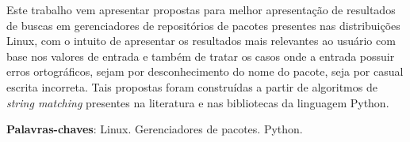 \begin{resumo}

Este trabalho vem apresentar propostas para melhor apresentação de resultados de buscas em gerenciadores de repositórios de pacotes presentes nas distribuições Linux, com o intuito de apresentar os resultados mais relevantes ao usuário com base nos valores de entrada e também de tratar os casos onde a entrada possuir erros ortográficos, sejam por desconhecimento do nome do pacote, seja por casual escrita incorreta. Tais propostas foram construídas a partir de algoritmos de \textit{string matching} presentes na literatura e nas bibliotecas da linguagem Python.

 \vspace{\onelineskip}
    
 \noindent
 \textbf{Palavras-chaves}: Linux. Gerenciadores de pacotes. Python.
\end{resumo}
